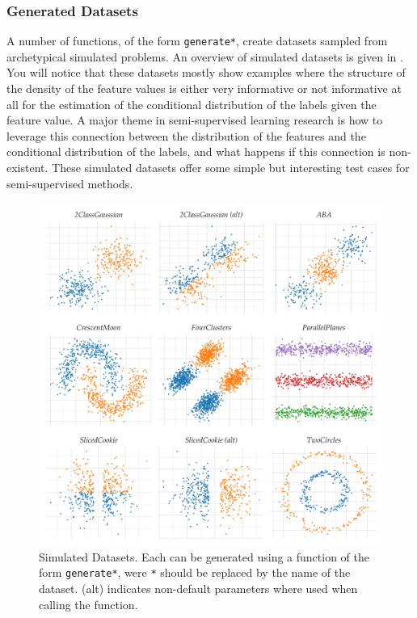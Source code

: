 \documentclass[twoside]{memoir}\usepackage[]{graphicx}\usepackage{xcolor}
\makeatletter
\def\maxwidth{ %
  \ifdim\Gin@nat@width>\linewidth
    \linewidth
  \else
    \Gin@nat@width
  \fi
}
\newenvironment{knitrout}{}{} %
\makeatother
\begin{document}
\subsubsection{Generated Datasets}
A number of functions, of the form \texttt{generate*}, create datasets sampled from archetypical simulated problems. An overview of simulated datasets is given in . You will notice that these datasets mostly show examples where the structure of the density of the feature values is either very informative or not informative at all for the estimation of the conditional distribution of the labels given the feature value. A major theme in semi-supervised learning research is how to leverage this connection between the distribution of the features and the conditional distribution of the labels, and what happens if this connection is non-existent. These simulated datasets offer some simple but interesting test cases for semi-supervised methods.
\begin{knitrout}
\color{fgcolor}\begin{figure}
\includegraphics[width=\maxwidth]{figure/generateddatasets-1} \caption[Simulated Datasets]{Simulated Datasets. Each can be generated using a function of the form \texttt{generate*}, were \texttt{*} should be replaced by the name of the dataset. (alt) indicates non-default parameters where used when calling the function.}\label{fig:generateddatasets}
\end{figure}


\end{knitrout}
\end{document}
